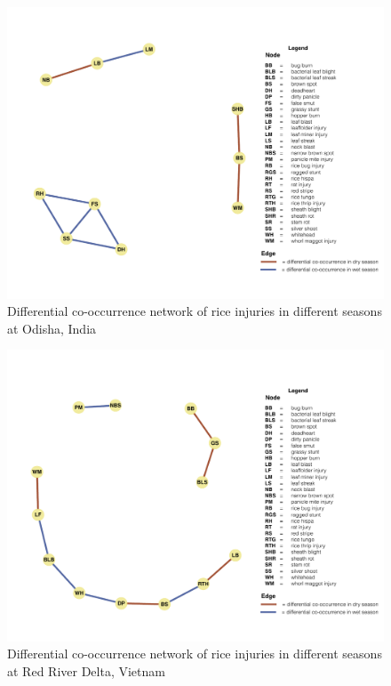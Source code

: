 \begin{figure}
\centering
\includegraphics[width = 1\textwidth]{figures/difseasonOR.pdf}
\caption{Differential co-occurrence network of rice injuries in different seasons at Odisha, India }
\label{fig:difseasonOR}
\end{figure}


\begin{figure}
\centering
\includegraphics[width = 1\textwidth]{figures/difseasonRR.pdf}
\caption{Differential co-occurrence network of rice injuries in different seasons at Red River Delta, Vietnam}
\label{fig:difseasonRR}
\end{figure}


